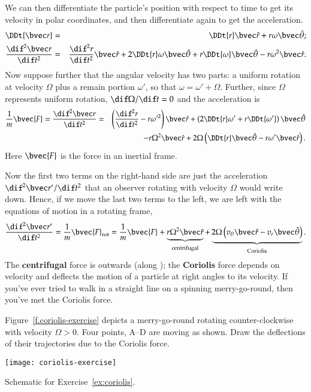 We can then differentiate the particle's position with respect to time to get its velocity in polar coordinates, and then differentiate again to get the acceleration.
\begin{eqnarray}
\DDt{\rv} &=& \DDt{r}\rhat + r\omega\thetahat; \\
\DDtt{\rv} &=& \DDtt{r}\rhat + 2\DDt{r}\omega\thetahat + r \DDt{\omega}\thetahat - r\omega^{2}\rhat.
\end{eqnarray}
Now suppose further that the angular velocity has two parts: a uniform rotation at velocity $\Omega$ plus a remain portion $\omega'$, so that $\omega = \omega'+\Omega$.  Further, since $\Omega$ represents uniform rotation, $\dif\Omega/\dif t = 0$ and the acceleration is
\begin{eqnarray}
\frac{1}{m}\bvec{F} = \DDtt{\rv} &=& \left(\DDtt{r} - r\omega'^{2}\right)\rhat + \left(2\DDt{r}\omega' + r\DDt{\omega'}\right)\thetahat\nonumber\\
 && -r\Omega^{2}\rhat + 2\Omega\left(\DDt{r}\thetahat - r\omega'\rhat\right).
\end{eqnarray}
Here $\bvec{F}$ is the force in an inertial frame.

Now the first two terms on the right-hand side are just the acceleration $\dif^{2}\rv'/\dif t^{2}$ that an observer rotating with velocity $\Omega$ would write down.  Hence, if we move the last two terms to the left, we are left with the equations of motion in a rotating frame,
\begin{equation}\label{e.motion-rotating}
\DDtt{\rv'} = \frac{1}{m}\bvec{F}_{\mathrm{rot}} = \frac{1}{m}\bvec{F} 
	+  \underbrace{r\Omega^{2}\rhat}_{\textrm{centrifugal}}
	+	\underbrace{2\Omega\left(v_{\theta}\rhat - v_{r}\thetahat \right)}_{\textrm{Coriolis}}.
\end{equation}
The \textbf{centrifugal} force is outwards (along \rhat); the \textbf{Coriolis} force depends on velocity and deflects the motion of a particle at right angles to its velocity.  If you've ever tried to walk in a straight line on a spinning merry-go-round, then you've met the Coriolis force.

\begin{exercisebox}
\label{ex:coriolis}
Figure~\ref{f.coriolis-exercise} depicts a merry-go-round rotating counter-clockwise with velocity $\Omega > 0$.  Four points, A--D are moving as shown.  Draw the deflections of their trajectories due to the Coriolis force.
\end{exercisebox}
\begin{marginfigure}
\texttt{[image: coriolis-exercise]}
\caption[Movement on a merry-go-round]{Schematic for Exercise~\ref{ex:coriolis}.
\label{f.coriolis-exercise}}
\end{marginfigure}

